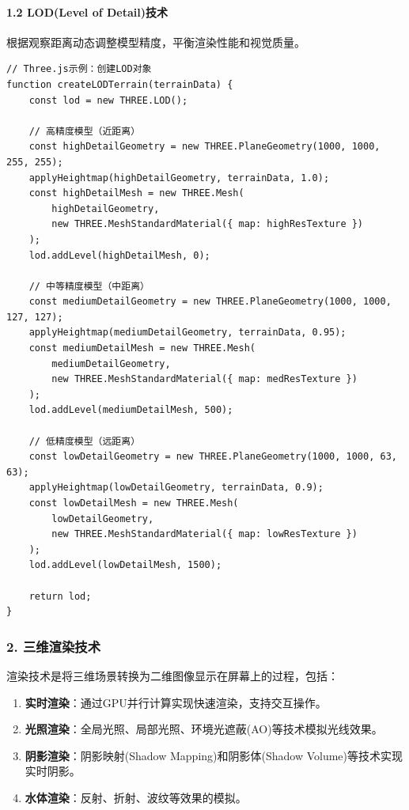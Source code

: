 \paragraph{1.2 LOD(Level of
Detail)技术}\label{lodlevel-of-detailux6280ux672f}

根据观察距离动态调整模型精度，平衡渲染性能和视觉质量。

\begin{lstlisting}
// Three.js示例：创建LOD对象
function createLODTerrain(terrainData) {
    const lod = new THREE.LOD();
    
    // 高精度模型（近距离）
    const highDetailGeometry = new THREE.PlaneGeometry(1000, 1000, 255, 255);
    applyHeightmap(highDetailGeometry, terrainData, 1.0);
    const highDetailMesh = new THREE.Mesh(
        highDetailGeometry,
        new THREE.MeshStandardMaterial({ map: highResTexture })
    );
    lod.addLevel(highDetailMesh, 0);
    
    // 中等精度模型（中距离）
    const mediumDetailGeometry = new THREE.PlaneGeometry(1000, 1000, 127, 127);
    applyHeightmap(mediumDetailGeometry, terrainData, 0.95);
    const mediumDetailMesh = new THREE.Mesh(
        mediumDetailGeometry,
        new THREE.MeshStandardMaterial({ map: medResTexture })
    );
    lod.addLevel(mediumDetailMesh, 500);
    
    // 低精度模型（远距离）
    const lowDetailGeometry = new THREE.PlaneGeometry(1000, 1000, 63, 63);
    applyHeightmap(lowDetailGeometry, terrainData, 0.9);
    const lowDetailMesh = new THREE.Mesh(
        lowDetailGeometry,
        new THREE.MeshStandardMaterial({ map: lowResTexture })
    );
    lod.addLevel(lowDetailMesh, 1500);
    
    return lod;
}
\end{lstlisting}

\subsubsection{2.
三维渲染技术}\label{ux4e09ux7ef4ux6e32ux67d3ux6280ux672f}

渲染技术是将三维场景转换为二维图像显示在屏幕上的过程，包括：

\begin{enumerate}
\def\labelenumi{\arabic{enumi}.}
\tightlist
\item
  \textbf{实时渲染}：通过GPU并行计算实现快速渲染，支持交互操作。
\item
  \textbf{光照渲染}：全局光照、局部光照、环境光遮蔽(AO)等技术模拟光线效果。
\item
  \textbf{阴影渲染}：阴影映射(Shadow Mapping)和阴影体(Shadow
  Volume)等技术实现实时阴影。
\item
  \textbf{水体渲染}：反射、折射、波纹等效果的模拟。
\end{enumerate}

